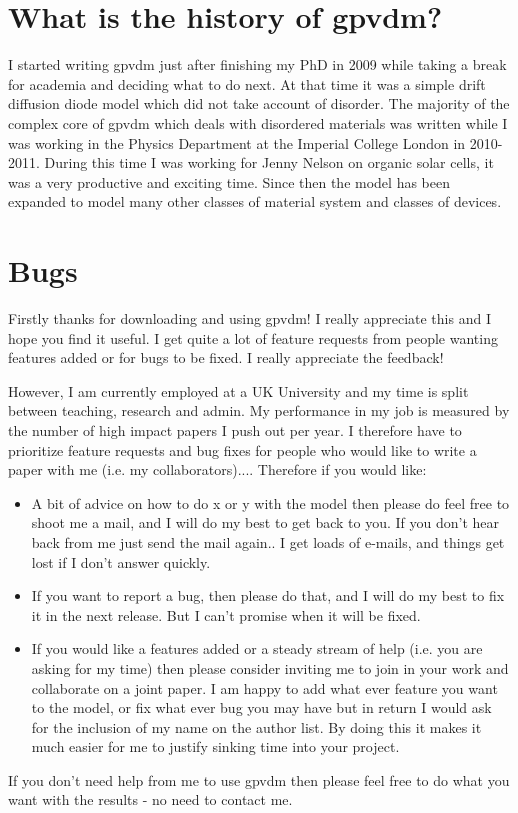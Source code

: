 \section{What is the history of gpvdm?}
I started writing gpvdm just after finishing my PhD in 2009 while taking a break for academia and deciding what to do next. At that time it was a simple drift diffusion diode model which did not take account of disorder. The majority of the complex core of gpvdm which deals with disordered materials was written while I was working in the Physics Department at the Imperial College London in 2010-2011. During this time I was working for Jenny Nelson on organic solar cells, it was a very productive and exciting time. Since then the model has been expanded to model many other classes of material system and classes of devices.




\section{Bugs}
Firstly thanks for downloading and using gpvdm! I really appreciate this and I hope you find it useful. I get quite a lot of feature requests from people wanting features added or for bugs to be fixed. I really appreciate the feedback!

However, I am currently employed at a UK University and my time is split between teaching, research and admin. My performance in my job is measured by the number of high impact papers I push out per year. I therefore have to prioritize feature requests and bug fixes for people who would like to write a paper with me (i.e. my collaborators).... Therefore if you would like:

\begin{itemize}
  \item A bit of advice on how to do x or y with the model then please do feel free to shoot me a mail, and I will do my best to get back to you. If you don't hear back from me just send the mail again.. I get loads of e-mails, and things get lost if I don't answer quickly.
  \item If you want to report a bug, then please do that, and I will do my best to fix it in the next release. But I can't promise when it will be fixed.
  \item  If you would like a features added or a steady stream of help (i.e. you are asking for my time) then please consider inviting me to join in your work and collaborate on a joint paper. I am happy to add what ever feature you want to the model, or fix what ever bug you may have but in return I would ask for the inclusion of my name on the author list. By doing this it makes it much easier for me to justify sinking time into your project.
\end{itemize}
    
If you don't need help from me to use gpvdm then please feel free to do what you want with the results - no need to contact me.

